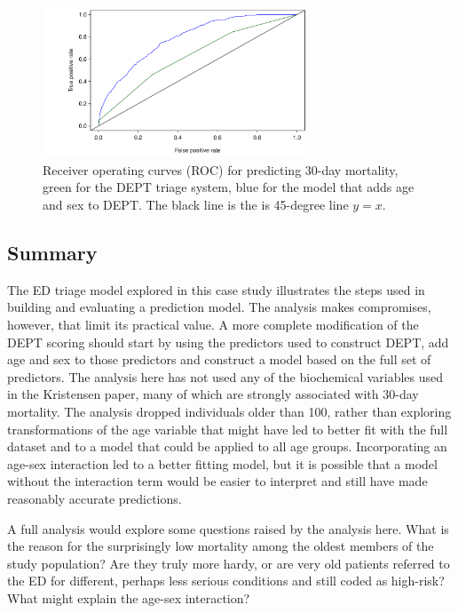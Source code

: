 \begin{figure}[!tbh]
  \centering
  \includegraphics[width=0.70\textwidth]
  {ch_logistic_regression_oi_biostat/figures/ROCDanishED/ROCDanishED.pdf}
    \caption{Receiver operating curves (ROC) for predicting 30-day mortality,  green for the DEPT triage system, blue for the model that adds age and sex to DEPT\@.  The black line is the is 45-degree line $y = x$.}
    \label{figure:ROCDanishED}
\end{figure}

\textD{\newpage}

\subsection{Summary}
\label{section:interpretationNewColorScore}

The ED triage model explored in this case study illustrates the steps used in building and evaluating a prediction model.   The analysis makes compromises, however, that limit its practical value.  A more complete modification of the DEPT scoring should start by using the predictors used to construct DEPT, add age and sex to those predictors and construct a model based on the full set of predictors.   The analysis here has not used any of the biochemical variables used in the Kristensen paper, many of which are strongly associated with 30-day mortality. The analysis dropped individuals older than 100, rather than exploring transformations of the age variable that might have led to  better fit with the full dataset and to a model that could be applied to all age groups.  Incorporating an age-sex interaction led to a better fitting model, but it is possible that a model without the interaction term would be easier to interpret and still have made reasonably accurate predictions. 

A full analysis would explore some questions raised by the analysis here.  What is the reason for the surprisingly low mortality among the oldest members of the study population? Are they truly more hardy, or are very old patients referred to the ED for different, perhaps less serious conditions and still coded as high-risk?  What might explain the age-sex interaction? 


